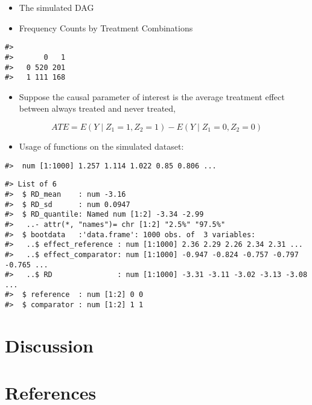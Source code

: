 \begin{itemize}
\tightlist
\item
  The simulated DAG
\end{itemize}

\begin{itemize}
\tightlist
\item
  Frequency Counts by Treatment Combinations
\end{itemize}

\begin{verbatim}
#>    
#>       0   1
#>   0 520 201
#>   1 111 168
\end{verbatim}

\begin{itemize}
\tightlist
\item
  Suppose the causal parameter of interest is the average treatment
  effect between always treated and never treated,
\end{itemize}

\[
ATE = E(Y \mid Z_1 = 1, Z_2 = 1) - E(Y \mid Z_1 = 0, Z_2 = 0)
\]

\begin{itemize}
\tightlist
\item
  Usage of functions on the simulated dataset:
\end{itemize}

\begin{verbatim}
#>  num [1:1000] 1.257 1.114 1.022 0.85 0.806 ...
\end{verbatim}

\begin{verbatim}
#> List of 6
#>  $ RD_mean    : num -3.16
#>  $ RD_sd      : num 0.0947
#>  $ RD_quantile: Named num [1:2] -3.34 -2.99
#>   ..- attr(*, "names")= chr [1:2] "2.5%" "97.5%"
#>  $ bootdata   :'data.frame': 1000 obs. of  3 variables:
#>   ..$ effect_reference : num [1:1000] 2.36 2.29 2.26 2.34 2.31 ...
#>   ..$ effect_comparator: num [1:1000] -0.947 -0.824 -0.757 -0.797 -0.765 ...
#>   ..$ RD               : num [1:1000] -3.31 -3.11 -3.02 -3.13 -3.08 ...
#>  $ reference  : num [1:2] 0 0
#>  $ comparator : num [1:2] 1 1
\end{verbatim}

\section{Discussion}\label{discussion}

\section*{References}\label{references}

